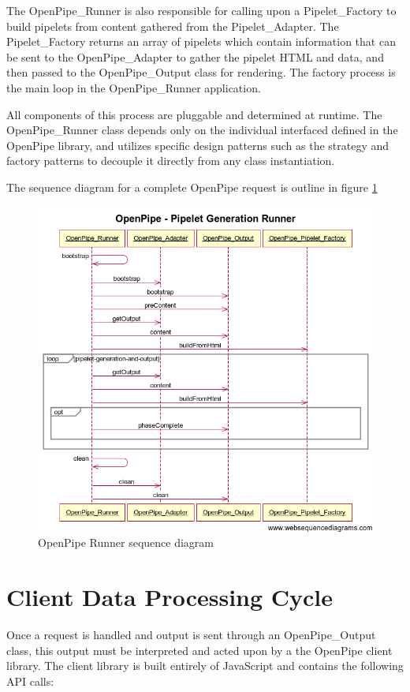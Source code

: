 \documentclass[12pt]{report}
\begin{document}
The OpenPipe\_Runner is also responsible for calling upon a Pipelet\_Factory to build pipelets from content gathered from the Pipelet\_Adapter. The Pipelet\_Factory returns an array of pipelets which contain information that can be sent to the OpenPipe\_Adapter to gather the pipelet HTML and data, and then passed to the OpenPipe\_Output class for rendering. The factory process is the main loop in the OpenPipe\_Runner application.

All components of this process are pluggable and determined at runtime. The OpenPipe\_Runner class depends only on the individual interfaced defined in the OpenPipe library, and utilizes specific design patterns such as the strategy and factory patterns to decouple it directly from any class instantiation.

The sequence diagram for a complete OpenPipe request is outline in figure \ref{fig:openPipeRunnerSequenceDiagram}

\begin{figure}[H]
\label{fig:openPipeRunnerSequenceDiagram}
\centering
\includegraphics[width=\textwidth,keepaspectratio]{figures/images/openpipe_runner.png}
\caption{OpenPipe Runner sequence diagram}
\end{figure}

\section{Client Data Processing Cycle}
Once a request is handled and output is sent through an OpenPipe\_Output class, this output must be interpreted and acted upon by a the OpenPipe client library.  The client library is built entirely of JavaScript and contains the following API calls:
\end{document}
